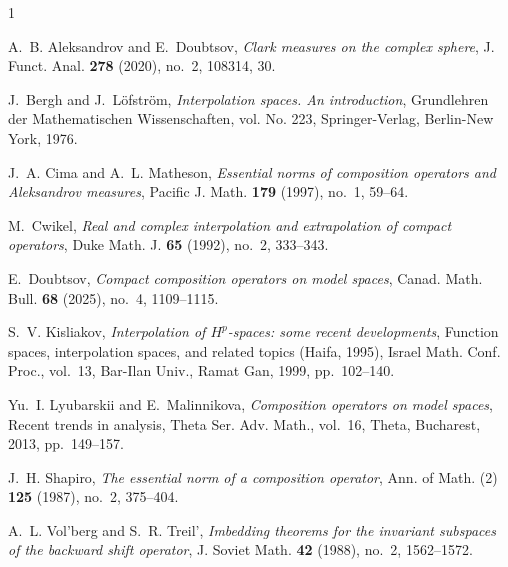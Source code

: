 \documentclass{amsart}
\numberwithin{equation}{section}
\theoremstyle{definition}
\begin{document}

%
\begin{thebibliography}{1}

A.~B. Aleksandrov and E.~Doubtsov, \emph{Clark measures on the complex sphere},
  J. Funct. Anal. \textbf{278} (2020), no.~2, 108314, 30. 

J.~Bergh and J.~L\"{o}fstr\"{o}m, \emph{Interpolation spaces. {A}n
  introduction}, Grundlehren der Mathematischen Wissenschaften, vol. No. 223,
  Springer-Verlag, Berlin-New York, 1976. 

J.~A. Cima and A.~L. Matheson, \emph{Essential norms of composition operators
  and {A}leksandrov measures}, Pacific J. Math. \textbf{179} (1997), no.~1,
  59--64. 

M.~Cwikel, \emph{Real and complex interpolation and extrapolation of compact
  operators}, Duke Math. J. \textbf{65} (1992), no.~2, 333--343. 

E.~Doubtsov, \emph{Compact composition operators on model spaces}, Canad. Math.
  Bull. \textbf{68} (2025), no.~4, 1109--1115. 

S.~V. Kisliakov, \emph{Interpolation of {$H^p$}-spaces: some recent
  developments}, Function spaces, interpolation spaces, and related topics
  ({H}aifa, 1995), Israel Math. Conf. Proc., vol.~13, Bar-Ilan Univ., Ramat
  Gan, 1999, pp.~102--140. 

Yu.~I. Lyubarskii and E.~Malinnikova, \emph{Composition operators on model
  spaces}, Recent trends in analysis, Theta Ser. Adv. Math., vol.~16, Theta,
  Bucharest, 2013, pp.~149--157. 

J.~H. Shapiro, \emph{The essential norm of a composition operator}, Ann. of
  Math. (2) \textbf{125} (1987), no.~2, 375--404. 

A.~L. Vol'berg and S.~R. Treil', \emph{Imbedding theorems for the invariant
  subspaces of the backward shift operator}, J. Soviet Math. \textbf{42}
  (1988), no.~2, 1562--1572. 

\end{thebibliography}
\end{document}
